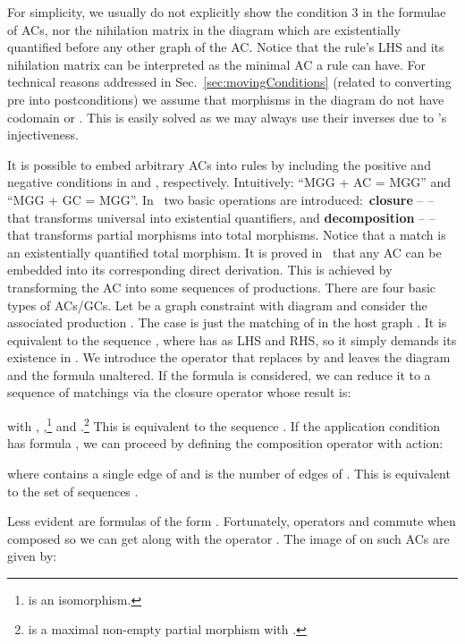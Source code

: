 \documentclass{fundam}
\begin{document}
For simplicity, we usually do not explicitly show the condition 3 in
the formulae of ACs, nor the nihilation matrix  in the diagram
which are existentially quantified before any other graph of the
AC. Notice that the rule's LHS and its nihilation matrix can be
interpreted as the minimal AC a rule can have. For technical reasons
addressed in Sec.~\ref{sec:movingConditions} (related to converting
pre into postconditions) we assume that morphisms  in the diagram
do not have codomain  or . This is easily solved as we may
always use their inverses due to 's injectiveness.

It is possible to embed arbitrary ACs into rules by including the
positive and negative conditions in  and , respectively.
Intuitively: ``MGG + AC = MGG'' and ``MGG + GC =
MGG''. In~\cite{MGGfundamenta} two basic operations are
introduced:~\textbf{closure} --  -- that transforms
universal into existential quantifiers, and \textbf{decomposition} --
 -- that transforms partial morphisms into total
morphisms. Notice that a match is an existentially quantified total
morphism. It is proved in~\cite{MGGfundamenta} that any AC can be
embedded into its corresponding direct derivation. This is achieved by
transforming the AC into some sequences of productions. There are four
basic types of ACs/GCs. Let  be a graph constraint with diagram 
and consider the associated production . The case
 is just the matching of  in the host
graph . It is equivalent to the sequence , where 
has  as LHS and RHS, so it simply demands its existence in . We
introduce the operator  that replaces  by  and leaves
the diagram and the formula unaltered. If the formula  is considered, we can reduce it to a sequence of
matchings via the closure operator  whose result is:
 
with , ,\footnote{ is an isomorphism.}
 and .\footnote{ is a
  maximal non-empty partial morphism with .} This is
equivalent to the sequence . If the
application condition has formula ,
we can proceed by defining the composition operator 
with action:

where  contains a single edge of  and  is the number of
edges of . This is equivalent to the set of sequences .

Less evident are formulas of the form . Fortunately, operators 
and  commute when composed so we can get along with the
operator . The image of  on
such ACs are given by:
\end{document}
